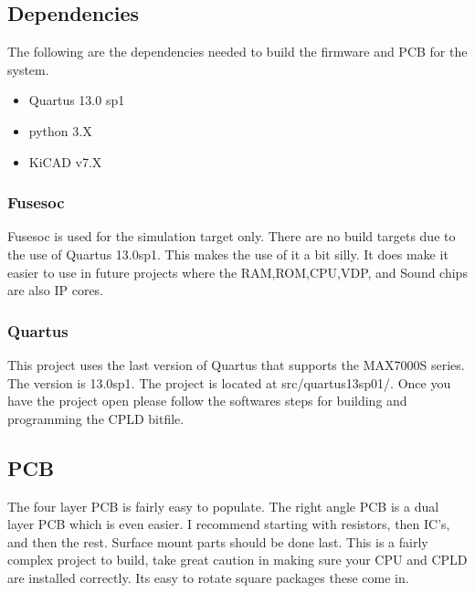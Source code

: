 \subsection{Dependencies}

\par
The following are the dependencies needed to build the firmware and PCB for the system.

\begin{itemize}
  \item Quartus 13.0 sp1
  \item python 3.X
  \item KiCAD v7.X
\end{itemize}



\subsubsection{Fusesoc}
\par
Fusesoc is used for the simulation target only. There are no build targets due to the use of Quartus 13.0sp1.
This makes the use of it a bit silly. It does make it easier to use in future projects where the RAM,ROM,CPU,VDP,
and Sound chips are also IP cores.



\subsubsection{Quartus}
\par
This project uses the last version of Quartus that supports the MAX7000S series. The version is 13.0sp1.
The project is located at src/quartus13sp01/. Once you have the project open please follow the softwares steps
for building and programming the CPLD bitfile.

\subsection{PCB}

\par
The four layer PCB is fairly easy to populate. The right angle PCB is a dual layer PCB which is even easier.
I recommend starting with resistors, then IC's, and then the rest. Surface mount parts should be done last.
This is a fairly complex project to build, take great caution in making sure your CPU and CPLD are installed
correctly. Its easy to rotate square packages these come in.

